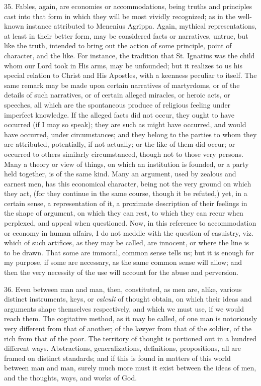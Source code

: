 35. Fables, again, are economies or accommodations, being truths
and principles cast into that form in which they will be most vividly
recognized; as in the well-known instance attributed to Menenius
Agrippa. Again, mythical representations, at least in their better
form, may be considered facts or narratives, untrue, but like the
truth, intended to bring out the action of some principle, point of
character, and the like. For instance, the tradition that St. Ignatius
was the child whom our Lord took in His arms, may be unfounded; but it
realizes to us his special relation to Christ and His Apostles, with a
keenness peculiar to itself. The same remark may be made upon certain
narratives of martyrdoms, or of the details of such narratives, or of
certain alleged miracles, or heroic acts, or speeches, all which are
the spontaneous produce of religious feeling under imperfect
knowledge. If the alleged facts did not occur, they ought to have
occurred (if I may so speak); they are such as might have occurred,
and would have occurred, under circumstances; and they belong to the
parties to whom they are attributed, potentially, if not actually; or
the like of them did occur; or occurred to others similarly
circumstanced, though not to those very persons. Many a theory or view
of things, on which an institution is founded, or a party held
together, is of the same kind. Many an argument, used by zealous and
earnest men, has this economical character, being not the very ground
on which they act, (for they continue in the same course, though it be
refuted,) yet, in a certain sense, a representation of it, a proximate
description of their feelings in the shape of argument, on which they
can rest, to which they can recur when perplexed, and appeal when
questioned. Now, in this reference to accommodation or economy in
human affairs, I do not meddle with the question of casuistry, viz.
which of such artifices, as they may be called, are innocent, or where
the line is to be drawn. That some are immoral, common sense tells us;
but it is enough for my purpose, if some are necessary, as the same
common sense will allow; and then the very necessity of the use will
account for the abuse and perversion.

36. Even between man and man, then, constituted, as men are, alike,
various distinct instruments, keys, or \emph{calculi} of thought
obtain, on which their ideas and arguments shape themselves
respectively, and which we must use, if we would reach them. The
cogitative method, as it may be called, of one man is notoriously very
different from that of another; of the lawyer from that of the
soldier, of the rich from that of the poor. The territory of thought
is portioned out in a hundred different ways. Abstractions,
generalizations, definitions, propositions, all are framed on distinct
standards; and if this is found in matters of this world between man
and man, surely much more must it exist between the ideas of men, and
the thoughts, ways, and works of God.

